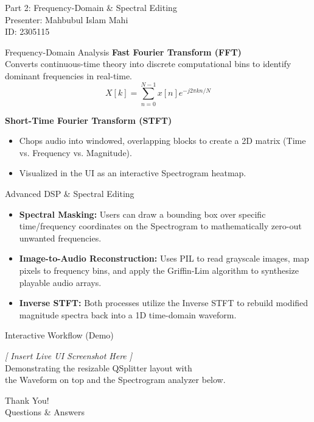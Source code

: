 \documentclass[11pt, aspectratio=169]{beamer}
\begin{document}
\begin{frame}[standout]
  Part 2: Frequency-Domain \& Spectral Editing \\
  \vspace{0.5em}
  \large Presenter: Mahbubul Islam Mahi \\
  \normalsize ID: 2305115
\end{frame}

\begin{frame}{Frequency-Domain Analysis}
  \textbf{Fast Fourier Transform (FFT)} \\
  Converts continuous-time theory into discrete computational bins to identify dominant frequencies in real-time.
  \[ X[k] = \sum_{n=0}^{N-1} x[n] e^{-j 2\pi k n / N} \]
  
  \pause
  \vspace{0.5em}
  \textbf{Short-Time Fourier Transform (STFT)} \\
  \begin{itemize}[<+->]
    \item Chops audio into windowed, overlapping blocks to create a 2D matrix (Time vs. Frequency vs. Magnitude).
    \item Visualized in the UI as an interactive Spectrogram heatmap.
  \end{itemize}
\end{frame}

\begin{frame}{Advanced DSP \& Spectral Editing}
  \begin{itemize}[<+->]
    \item \textbf{Spectral Masking:} Users can draw a bounding box over specific time/frequency coordinates on the Spectrogram to mathematically zero-out unwanted frequencies.
    \item \textbf{Image-to-Audio Reconstruction:} Uses PIL to read grayscale images, map pixels to frequency bins, and apply the Griffin-Lim algorithm to synthesize playable audio arrays.
    \item \textbf{Inverse STFT:} Both processes utilize the Inverse STFT to rebuild modified magnitude spectra back into a 1D time-domain waveform.
  \end{itemize}
\end{frame}

\begin{frame}{Interactive Workflow (Demo)}
  \begin{center}
    \vspace{2em}
    \textit{[ Insert Live UI Screenshot Here ]} \\
    \vspace{1em}
    Demonstrating the resizable QSplitter layout with \\ the Waveform on top and the Spectrogram analyzer below.
  \end{center}
\end{frame}

\begin{frame}[standout]
  Thank You! \\
  \vspace{0.5em}
  \large Questions \& Answers
\end{frame}
\end{document}
